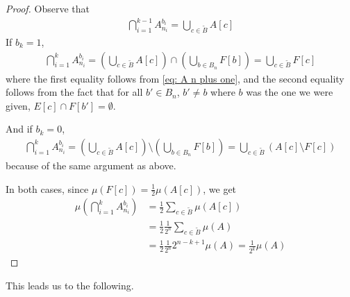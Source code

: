 \documentclass[../../main.tex]{subfiles}
\begin{document}
\begin{proof}
Observe that
\begin{align*}
	\bigcap_{i=1}^{k-1} A_{n_{i}}^{b_{i}} = \bigcup_{c\in \tilde{B}} A[c]
\end{align*}
If $b_{k}=1$,
\begin{align*}
	\bigcap_{i=1}^{k} A_{n_{i}}^{b_{i}} = \left( \bigcup_{c\in \tilde{B}} A[c] \right) \cap \left( \bigcup_{b\in B_{n}}F[b] \right) = \bigcup_{c\in \tilde{B}} F[c]
\end{align*}
where the first equality follows from \eqref{eq: A n plus one}, and the second equality follows from the fact that for all $b' \in B_{n}$, $b' \neq b$ where $b$ was the one we were given, $E[c] \cap F[b']=\emptyset$.

And if $b_{k}=0$,
\begin{align*}
	\bigcap_{i=1}^{k} A_{n_{i}}^{b_{i}} = \left( \bigcup_{c\in \tilde{B}} A[c] \right) \setminus \left( \bigcup_{b\in B_{n}}F[b] \right) = \bigcup_{c\in \tilde{B}} (A[c] \setminus F[c])
\end{align*}
because of the same argument as above.

In both cases, since $\mu(F[c])=\frac{1}{2}\mu(A[c])$, we get
\begin{align*}
	\mu\left( \bigcap_{i=1}^{k} A_{n_{i}}^{b_{i}} \right) &= \frac{1}{2} \sum_{c\in \tilde{B}} \mu(A[c]) \\
	&=\frac{1}{2}\frac{1}{2^{n}} \sum_{c\in \tilde{B}} \mu(A) \\
	&= \frac{1}{2}\frac{1}{2^{n}}2^{n-k+1}\mu(A)=\frac{1}{2^{k}}\mu(A)
\end{align*}
\end{proof}

This leads us to the following.

\end{document}
